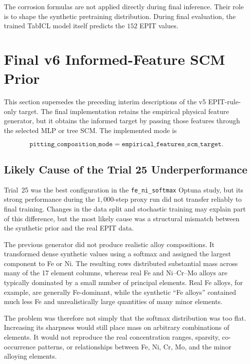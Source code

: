 \documentclass{article}
\begin{document}
The corrosion formulas are not applied directly during final inference. Their
role is to shape the synthetic pretraining distribution. During final
evaluation, the trained TabICL model itself predicts the \(152\) EPIT values.

\section{Final v6 Informed-Feature SCM Prior}

This section supersedes the preceding interim descriptions of the v5
EPIT-rule-only target. The final implementation retains the empirical physical
feature generator, but it obtains the informed target by passing those
features through the selected MLP or tree SCM. The implemented mode is

\[
\texttt{pitting\_composition\_mode}
=
\texttt{empirical\_features\_scm\_target}.
\]

\subsection{Likely Cause of the Trial 25 Underperformance}

Trial~25 was the best configuration in the
\texttt{fe\_ni\_softmax} Optuna study, but its strong performance during the
\(1{,}000\)-step proxy run did not transfer reliably to final training.
Changes in the data split and stochastic training may explain part of this
difference, but the most likely cause was a structural mismatch between the
synthetic prior and the real EPIT data.

The previous generator did not produce realistic alloy compositions. It
transformed dense synthetic values using a softmax and assigned the largest
component to Fe or Ni. The resulting rows distributed substantial mass across
many of the 17 element columns, whereas real Fe and Ni--Cr--Mo alloys are
typically dominated by a small number of principal elements. Real Fe alloys,
for example, are generally Fe-dominant, while the synthetic ``Fe alloys''
contained much less Fe and unrealistically large quantities of many minor
elements.

The problem was therefore not simply that the softmax distribution was too
flat. Increasing its sharpness would still place mass on arbitrary combinations
of elements. It would not reproduce the real concentration ranges, sparsity,
co-occurrence patterns, or relationships between Fe, Ni, Cr, Mo, and the minor
alloying elements.
\end{document}
